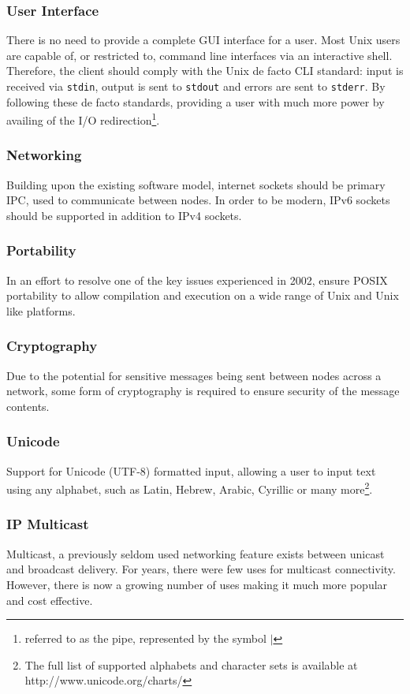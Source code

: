 
\subsubsection{User Interface}

There is no need to provide a complete GUI interface for  a user. Most
Unix users are capable of, or restricted to, command line interfaces via
an interactive shell. Therefore, the client should comply with the 
Unix de facto CLI standard: input is received via \verb!stdin!, output
is sent to \verb!stdout! and errors are sent to \verb!stderr!. By
following these de facto standards, providing a user with much more 
power by availing of the I/O 
redirection\footnote{referred to as the pipe, represented by the symbol $\mid$}.

\subsubsection{Networking}

Building upon the existing software model, internet sockets should be 
primary IPC, used to communicate between nodes. In order to be modern,
IPv6 sockets should be supported in addition to IPv4 sockets.

\subsubsection{Portability}

In an effort to resolve one of the key issues experienced in 2002, 
ensure POSIX portability to allow compilation and execution on a wide 
range of Unix and Unix like platforms.

\subsubsection{Cryptography}

Due to the potential for sensitive messages being sent between nodes
across a network, some form of cryptography is required to ensure 
security of the message contents.

\subsubsection{Unicode}

Support for Unicode (UTF-8) formatted input, allowing a user to input 
text using any alphabet, such as Latin, Hebrew, Arabic, Cyrillic or 
many more\footnote{The full list of supported alphabets and character sets is available at http://www.unicode.org/charts/}.

\subsubsection{IP Multicast}

Multicast, a previously seldom used networking feature exists between 
unicast and broadcast delivery. For years, there were few uses for 
multicast connectivity. However, there is now a growing number of uses 
making it much more popular and cost effective. 

